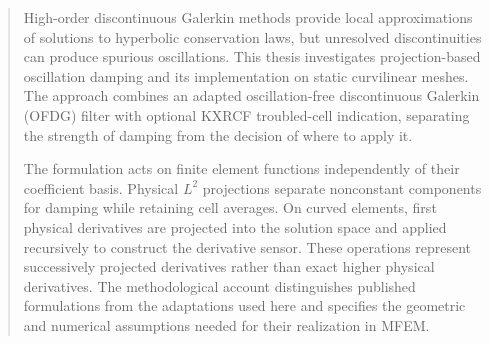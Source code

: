 \begin{abstract}

High-order discontinuous Galerkin methods provide local approximations of
solutions to hyperbolic conservation laws, but unresolved discontinuities can
produce spurious oscillations. This thesis investigates projection-based
oscillation damping and its implementation on static curvilinear meshes.
The approach combines an adapted oscillation-free discontinuous Galerkin
(OFDG) filter with optional KXRCF troubled-cell indication, separating the
strength of damping from the decision of where to apply it.

The formulation acts on finite element functions independently of their
coefficient basis. Physical $L^2$ projections separate nonconstant components
for damping while retaining cell averages. On curved elements, first physical
derivatives are projected into the solution space and applied recursively to
construct the derivative sensor. These operations represent successively
projected derivatives rather than exact higher physical derivatives.
The methodological account distinguishes published formulations from the
adaptations used here and specifies the geometric and numerical assumptions
needed for their realization in MFEM.
\end{abstract}
